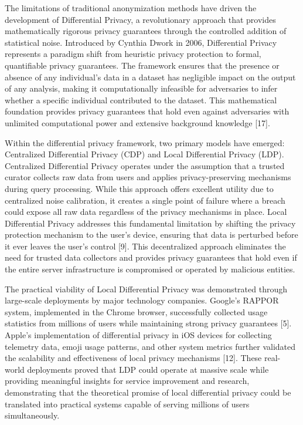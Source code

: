 \documentclass[conference]{IEEEtran}
\begin{document}
The limitations of traditional anonymization methods have driven the development of Differential Privacy, a revolutionary approach that provides mathematically rigorous privacy guarantees through the controlled addition of statistical noise. Introduced by Cynthia Dwork in 2006, Differential Privacy represents a paradigm shift from heuristic privacy protection to formal, quantifiable privacy guarantees. The framework ensures that the presence or absence of any individual's data in a dataset has negligible impact on the output of any analysis, making it computationally infeasible for adversaries to infer whether a specific individual contributed to the dataset. This mathematical foundation provides privacy guarantees that hold even against adversaries with unlimited computational power and extensive background knowledge [17].

Within the differential privacy framework, two primary models have emerged: Centralized Differential Privacy (CDP) and Local Differential Privacy (LDP). Centralized Differential Privacy operates under the assumption that a trusted curator collects raw data from users and applies privacy-preserving mechanisms during query processing. While this approach offers excellent utility due to centralized noise calibration, it creates a single point of failure where a breach could expose all raw data regardless of the privacy mechanisms in place. Local Differential Privacy addresses this fundamental limitation by shifting the privacy protection mechanism to the user's device, ensuring that data is perturbed before it ever leaves the user's control [9]. This decentralized approach eliminates the need for trusted data collectors and provides privacy guarantees that hold even if the entire server infrastructure is compromised or operated by malicious entities.

The practical viability of Local Differential Privacy was demonstrated through large-scale deployments by major technology companies. Google's RAPPOR system, implemented in the Chrome browser, successfully collected usage statistics from millions of users while maintaining strong privacy guarantees [5]. Apple's implementation of differential privacy in iOS devices for collecting telemetry data, emoji usage patterns, and other system metrics further validated the scalability and effectiveness of local privacy mechanisms [12]. These real-world deployments proved that LDP could operate at massive scale while providing meaningful insights for service improvement and research, demonstrating that the theoretical promise of local differential privacy could be translated into practical systems capable of serving millions of users simultaneously.
\end{document}
